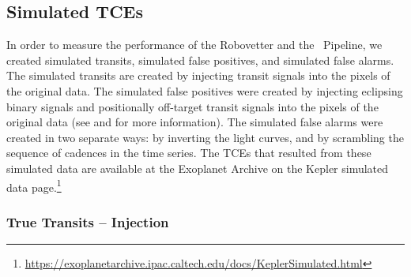 \subsection{Simulated TCEs}
\label{s:simulated}
In order to measure the performance of the Robovetter and the \Kepler\ Pipeline, we created simulated transits, simulated false positives, and simulated false alarms.  The simulated transits are created by injecting transit signals into the pixels of the original data. The simulated false positives were created by injecting eclipsing binary signals and positionally off-target transit signals into the pixels of the original data (see \citealt{Coughlin2017a} and \citealt{Christiansen2017} for more information). The simulated false alarms were created in two separate ways: by inverting the light curves, and by scrambling the sequence of cadences in the time series. The TCEs that resulted from these simulated data are available at the Exoplanet Archive on the Kepler simulated data page.\footnote{\label{kepsimpagefn}\url{https://exoplanetarchive.ipac.caltech.edu/docs/KeplerSimulated.html}}


\subsubsection{True Transits -- Injection}
\label{s:injecttce}

